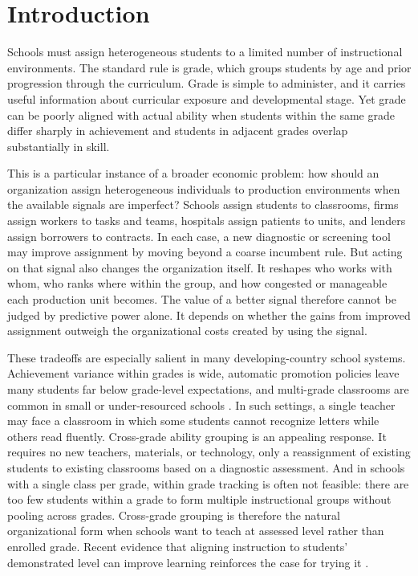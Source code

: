 \documentclass[11pt]{article}
\begin{document}
\section{Introduction}
\label{sec:intro}

Schools must assign heterogeneous students to a limited number of instructional environments. The standard rule is grade, which groups students by age and prior progression through the curriculum. Grade is simple to administer, and it carries useful information about curricular exposure and developmental stage. Yet grade can be poorly aligned with actual ability when students within the same grade differ sharply in achievement and students in adjacent grades overlap substantially in skill.

This is a particular instance of a broader economic problem: how should an organization assign heterogeneous individuals to production environments when the available signals are imperfect? Schools assign students to classrooms, firms assign workers to tasks and teams, hospitals assign patients to units, and lenders assign borrowers to contracts. In each case, a new diagnostic or screening tool may improve assignment by moving beyond a coarse incumbent rule. But acting on that signal also changes the organization itself. It reshapes who works with whom, who ranks where within the group, and how congested or manageable each production unit becomes. The value of a better signal therefore cannot be judged by predictive power alone. It depends on whether the gains from improved assignment outweigh the organizational costs created by using the signal.

These tradeoffs are especially salient in many developing-country school systems. Achievement variance within grades is wide, automatic promotion policies leave many students far below grade\mbox{-}level expectations, and multi-grade classrooms are common in small or under-resourced schools \citep{banerjee/cole/duflo/linden:2007,muralidharan2019disrupting}. In such settings, a single teacher may face a classroom in which some students cannot recognize letters while others read fluently. Cross-grade ability grouping is an appealing response. It requires no new teachers, materials, or technology, only a reassignment of existing students to existing classrooms based on a diagnostic assessment. And in schools with a single class per grade, within grade tracking is often not feasible: there are too few students within a grade to form multiple instructional groups without pooling across grades. Cross-grade grouping is therefore the natural organizational form when schools want to teach at assessed level rather than enrolled grade. Recent evidence that aligning instruction to students' demonstrated level can improve learning reinforces the case for trying it \citep{duflo2020experimental, duflo2011peer}.
\end{document}
